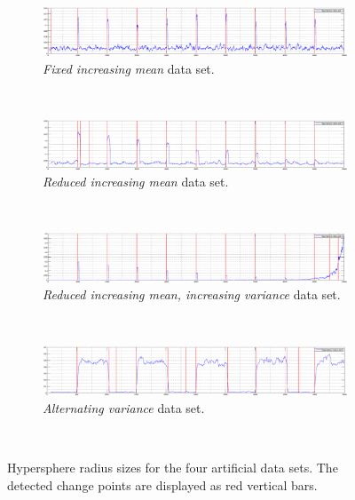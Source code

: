 \begin{figure}
  \centering
  \begin{subfigure}[b]{1\textwidth}
    \includegraphics[width=1\textwidth]{./Figures/chapter5/set_1_results.eps}
    \caption[Fixed increasing mean, thresholds]{\emph{Fixed increasing mean} data set.}
      \label{fig:camci_fixed_increasing_mean_thresholds}
  \end{subfigure} \\

  \begin{subfigure}[b]{1\textwidth}
   \includegraphics[width=1\textwidth]{./Figures/chapter5/set_2_results.eps}
    \caption[Reduced increasing mean, thresholds]{\emph{Reduced increasing mean} data set.}
    \label{fig:takeuchi_reduced_increasing_mean_thresholds}
  \end{subfigure} \\

  \begin{subfigure}[b]{1\textwidth}
    \includegraphics[width=1\textwidth]{./Figures/chapter5/set_3_results.eps}
      \caption[Reduced increasing mean, increasing variance, thresholds]{\emph{Reduced increasing mean, increasing variance} data set.}
      \label{fig:camci_reduced_increasing_mean_increasing_variance_thresholds}
  \end{subfigure} \\

  \begin{subfigure}[b]{1\textwidth}
   \includegraphics[width=1\textwidth]{./Figures/chapter5/set_4_results.eps}
    \caption[Alternating variance, thresholds]{\emph{Alternating variance} data set.}
    \label{fig:camci_takeuchi_alternating_variance_thresholds}
  \end{subfigure} \\

  \caption[Artificial data set results]{Hypersphere radius sizes for the four artificial data sets. The detected change points are displayed as red vertical bars.}
  \label{fig:plots_results_artificial_data_sets}
\end{figure}